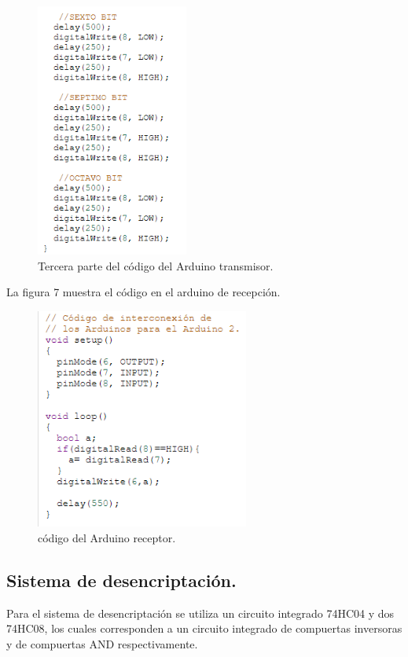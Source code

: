 \documentclass{article}
\begin{document}
\begin{figure}[h]
\includegraphics[width=5cm]{codigo_arduino1_3.PNG}
\centering
\caption{Tercera parte del código del Arduino transmisor.}
\label{fig:codigo_arduino1_3.PNG}
\end{figure}


La figura 7 muestra el código en el arduino de recepción.\\

\newpage


\begin{figure}[h]
\includegraphics[width=7cm]{codigo_arduino2.PNG}
\centering
\caption{código del Arduino receptor.}
\label{fig:codigo_arduino2.PNG}
\end{figure}

\newpage
\subsection{Sistema de desencriptación.}

Para el sistema de desencriptación se utiliza un circuito integrado 74HC04 y dos 74HC08, los cuales corresponden a un circuito integrado de compuertas inversoras y de compuertas AND respectivamente.
\end{document}
